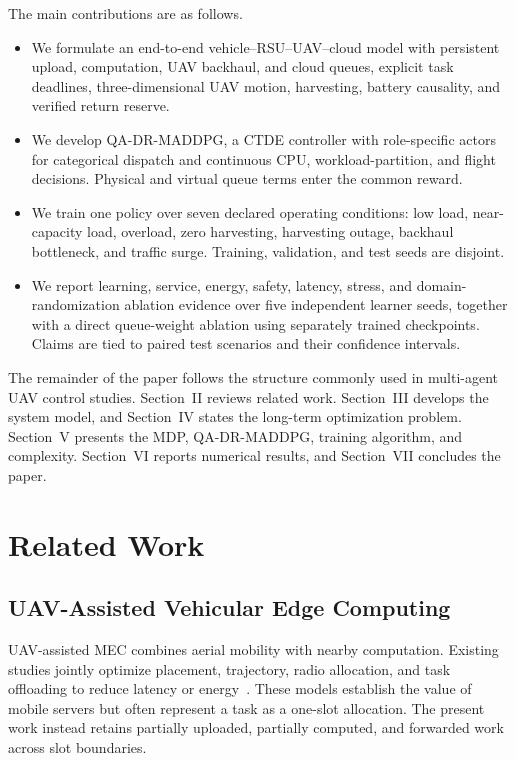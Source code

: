 \documentclass[journal]{IEEEtran}
\newcommand{\method}{QA-DR-MADDPG}
\begin{document}
The main contributions are as follows.
\begin{itemize}
  \item We formulate an end-to-end vehicle--RSU--UAV--cloud model with
  persistent upload, computation, UAV backhaul, and cloud queues, explicit
  task deadlines, three-dimensional UAV motion, harvesting, battery
  causality, and verified return reserve.
  \item We develop \method, a CTDE controller with role-specific actors for
  categorical dispatch and continuous CPU, workload-partition, and flight
  decisions. Physical and virtual queue terms enter the common reward.
  \item We train one policy over seven declared operating conditions: low load,
  near-capacity load, overload, zero harvesting, harvesting outage, backhaul
  bottleneck, and traffic surge. Training, validation, and test seeds are
  disjoint.
  \item We report learning, service, energy, safety, latency, stress, and
  domain-randomization ablation evidence over five independent learner seeds,
  together with a direct queue-weight ablation using separately trained
  checkpoints. Claims are tied to paired test scenarios and their confidence
  intervals.
\end{itemize}

The remainder of the paper follows the structure commonly used in
multi-agent UAV control studies. Section~II reviews related work.
Section~III develops the system model, and Section~IV states the long-term
optimization problem. Section~V presents the MDP, \method, training
algorithm, and complexity. Section~VI reports numerical results, and
Section~VII concludes the paper.


\iffalse
\section{Related Work}
\subsection{UAV-Assisted Vehicular Edge Computing}
UAV-assisted MEC combines aerial mobility with nearby computation. Existing
studies jointly optimize placement, trajectory, radio allocation, and task
offloading to reduce latency or energy~\cite{zhang2019mobile,liu2020uav}.
These models establish the value of mobile servers but often represent a task
as a one-slot allocation. The present work instead retains partially uploaded,
partially computed, and forwarded work across slot boundaries.
\end{document}

